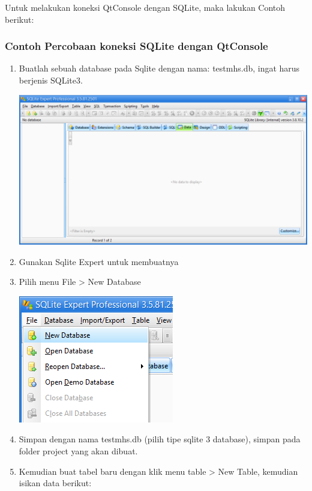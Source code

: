 Untuk melakukan koneksi QtConsole dengan SQLite, maka lakukan Contoh
berikut:

\subsubsection*{Contoh Percobaan koneksi SQLite dengan QtConsole}

\begin{enumerate}


\item
  Buatlah sebuah database pada Sqlite dengan nama: testmhs.db, ingat
  harus berjenis SQLite3.

\includegraphics[width=0.7\linewidth]{../manuscript/images/sqlite-expert}
  
  
\item
  Gunakan Sqlite Expert untuk membuatnya
\item
  Pilih menu File \textgreater{} New Database
  
  \includegraphics[width=0.7\linewidth]{../manuscript/images/file-new-database}
  
\item
  Simpan dengan nama testmhs.db (pilih tipe sqlite 3 database), simpan
  pada folder project yang akan dibuat.
\item
  Kemudian buat tabel baru dengan klik menu table \textgreater{} New Table,
  kemudian isikan data berikut:


\end{enumerate}
